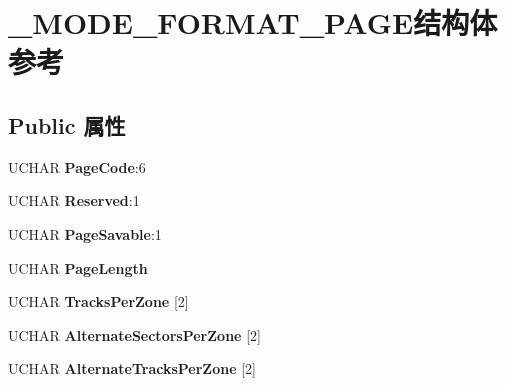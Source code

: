 \hypertarget{struct___m_o_d_e___f_o_r_m_a_t___p_a_g_e}{}\section{\+\_\+\+M\+O\+D\+E\+\_\+\+F\+O\+R\+M\+A\+T\+\_\+\+P\+A\+G\+E结构体 参考}
\label{struct___m_o_d_e___f_o_r_m_a_t___p_a_g_e}
\subsection*{Public 属性}
\begin{DoxyCompactItemize}
\item 
\mbox{\label{struct___m_o_d_e___f_o_r_m_a_t___p_a_g_e_adfd962e4daa6ded8671b62917404028f}} 
U\+C\+H\+AR {\bfseries Page\+Code}\+:6
\item 
\mbox{\label{struct___m_o_d_e___f_o_r_m_a_t___p_a_g_e_ad522a6cf34e8652090b9962f115adf29}} 
U\+C\+H\+AR {\bfseries Reserved}\+:1
\item 
\mbox{\label{struct___m_o_d_e___f_o_r_m_a_t___p_a_g_e_a3b5dce302bbce1bfc205867b4d496f81}} 
U\+C\+H\+AR {\bfseries Page\+Savable}\+:1
\item 
\mbox{\label{struct___m_o_d_e___f_o_r_m_a_t___p_a_g_e_a1015755f0f1ee24c7b5715757f21e834}} 
U\+C\+H\+AR {\bfseries Page\+Length}
\item 
\mbox{\label{struct___m_o_d_e___f_o_r_m_a_t___p_a_g_e_a76875e0d5b1f0e2b3a536ffdbd5ea77e}} 
U\+C\+H\+AR {\bfseries Tracks\+Per\+Zone} \mbox{[}2\mbox{]}
\item 
\mbox{\label{struct___m_o_d_e___f_o_r_m_a_t___p_a_g_e_a3ef1b2a83ad36f7f418af5e9d49bde46}} 
U\+C\+H\+AR {\bfseries Alternate\+Sectors\+Per\+Zone} \mbox{[}2\mbox{]}
\item 
\mbox{\label{struct___m_o_d_e___f_o_r_m_a_t___p_a_g_e_a8c04ab86ef95c3c54b8171a1cea9e0d1}} 
U\+C\+H\+AR {\bfseries Alternate\+Tracks\+Per\+Zone} \mbox{[}2\mbox{]}

\end{DoxyCompactItemize}
